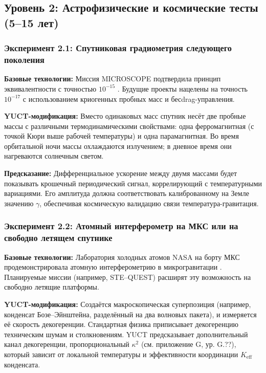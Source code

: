 \documentclass[12pt]{article}
\theoremstyle{remark}
\newcommand{\Keff}{K_{\mathrm{eff}}}
\begin{document}
	\subsection{Уровень 2: Астрофизические и космические тесты (5–15 лет)}
	\label{subsec:space-tests}
	
	\subsubsection{Эксперимент 2.1: Спутниковая градиометрия следующего поколения}
	
	\textbf{Базовые технологии:} Миссия MICROSCOPE подтвердила принцип эквивалентности с точностью \(10^{-15}\) \cite{Touboul2022}. Будущие проекты нацелены на точность \(10^{-17}\) с использованием криогенных пробных масс и бесdrag-управления.
	
	\textbf{YUCT-модификация:} Вместо одинаковых масс спутник несёт две пробные массы с различными термодинамическими свойствами: одна ферромагнитная (с точкой Кюри выше рабочей температуры) и одна парамагнитная. Во время орбитальной ночи массы охлаждаются излучением; в дневное время они нагреваются солнечным светом.
	
	\textbf{Предсказание:} Дифференциальное ускорение между двумя массами будет показывать крошечный периодический сигнал, коррелирующий с температурными вариациями. Его амплитуда должна соответствовать калиброванному на Земле значению \(\gamma\), обеспечивая космическую валидацию связи температура-гравитация.
	
	\subsubsection{Эксперимент 2.2: Атомный интерферометр на МКС или на свободно летящем спутнике}
	
	\textbf{Базовые технологии:} Лаборатория холодных атомов NASA на борту МКС продемонстрировала атомную интерферометрию в микрогравитации \cite{Aveline2020}. Планируемые миссии (например, STE–QUEST) расширят эту возможность на свободно летящие платформы.
	
	\textbf{YUCT-модификация:} Создаётся макроскопическая суперпозиция (например, конденсат Бозе–Эйнштейна, разделённый на два волновых пакета), и измеряется её скорость декогеренции. Стандартная физика приписывает декогеренцию техническим шумам и столкновениям. YUCT предсказывает дополнительный канал декогеренции, пропорциональный \(\kappa^2\) (см. приложение G, ур. G.??), который зависит от локальной температуры и эффективности координации \(\Keff\) конденсата.
	
\end{document}
